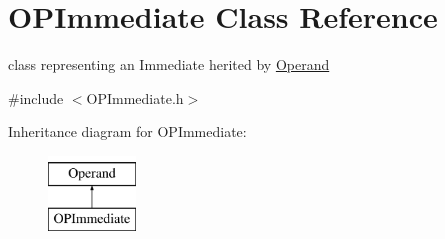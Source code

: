 \hypertarget{classOPImmediate}{\section{\-O\-P\-Immediate \-Class \-Reference}
\label{classOPImmediate}
}


class representing an \-Immediate herited by \hyperlink{classOperand}{\-Operand}  




{\ttfamily \#include $<$\-O\-P\-Immediate.\-h$>$}

\-Inheritance diagram for \-O\-P\-Immediate\-:\begin{figure}[H]
\begin{center}
\leavevmode
\includegraphics[height=2.000000cm]{classOPImmediate}
\end{center}
\end{figure}
